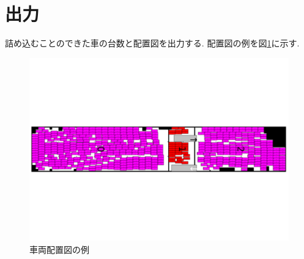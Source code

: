 \section{出力}
詰め込むことのできた車の台数と配置図を出力する. 配置図の例を図\ref{figure22}に示す. \\
\begin{figure}[b]
    \hspace{2cm}
    \includegraphics[scale=0.4, bb = 0 0 1 1]{2car_haichi.pdf}
    \caption{車両配置図の例}
    \label{figure22}
\end{figure}


